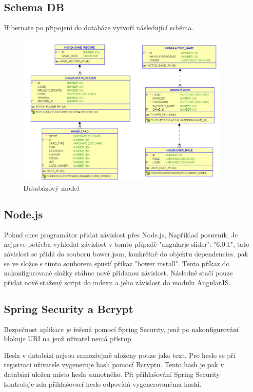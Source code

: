 \documentclass[czech,master,public,dept460,male,cpdeclaration,twoside]{diploma}
\begin{document}
\subsection{Schema DB}
Hibernate po připojení do databáze vytvoří následující schéma.
\begin{figure}[H]
\centering\includegraphics[width=0.95\textwidth]{Figures/DBmodel.png}\caption{Databázový model}
\end{figure}

\subsection{Node.js}
Pokud chce programátor přidat závislost přes Node.js, Například posuvník. Je nejprve potřeba vyhledat závislost v tomto případě "angularjs-slider": "6.0.1", tato závislost se přidá do souboru bower.json, konkrétně do objektu dependencies. pak se ve složce s tímto souborem spustí příkaz "bower install". Tento příkaz do nakonfigurované složky stáhne nově přidanou závislost. Následně stačí pouze přidat nově stažený script do indexu a jeho závislost do modulu AngularJS. 

\subsection{Spring Security a Bcrypt}
Bezpečnost aplikace je řešená pomocí Spring Security, jenž po nakonfigurování blokuje URI na jenž uživatel nemá přístup.

Hesla v databázi nejsou samozřejmě uloženy pouze jako text. Pro heslo se při registraci uživatele vygeneruje hash pomocí Bcryptu. Tento hash je pak v databázi uložen místo hesla samotného. Při přihlašování Spring Security kontroluje zda přihlašovací heslo odpovídá vygenerovanému hashi.
\end{document}
